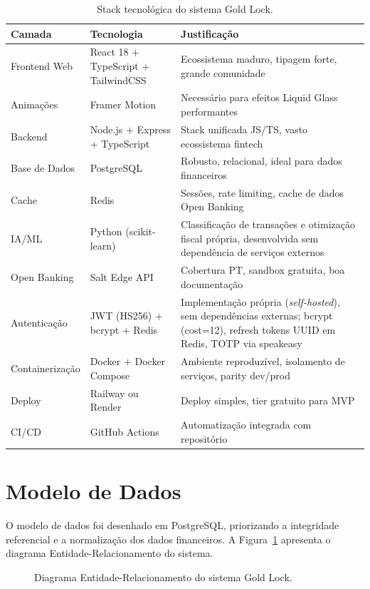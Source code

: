 \begin{table}[H]
\centering
\caption{Stack tecnológica do sistema Gold Lock.}
\label{tab:stack}
\small
\begin{tabularx}{\textwidth}{l l X}
\toprule
\textbf{Camada} & \textbf{Tecnologia} & \textbf{Justificação} \\
\midrule
Frontend Web & React 18 + TypeScript + TailwindCSS & Ecossistema maduro, tipagem forte, grande comunidade \\
Animações & Framer Motion & Necessário para efeitos Liquid Glass performantes \\
Backend & Node.js + Express + TypeScript & Stack unificada JS/TS, vasto ecossistema fintech \\
Base de Dados & PostgreSQL & Robusto, relacional, ideal para dados financeiros \\
Cache & Redis & Sessões, rate limiting, cache de dados Open Banking \\
IA/ML & Python (scikit-learn) & Classificação de transações e otimização fiscal própria, desenvolvida sem dependência de serviços externos \\
Open Banking & Salt Edge \ac{API} & Cobertura PT, sandbox gratuita, boa documentação \\
Autenticação & JWT (HS256) + bcrypt + Redis & Implementação própria (\textit{self-hosted}), sem dependências externas; bcrypt (cost=12), refresh tokens UUID em Redis, \ac{TOTP} via speakeasy \\
Containerização & Docker + Docker Compose & Ambiente reproduzível, isolamento de serviços, parity dev/prod \\
Deploy & Railway ou Render & Deploy simples, tier gratuito para \ac{MVP} \\
CI/CD & GitHub Actions & Automatização integrada com repositório \\
\bottomrule
\end{tabularx}
\end{table}


\section{Modelo de Dados}
\label{sec:arq-modelo-dados}

O modelo de dados foi desenhado em PostgreSQL, priorizando a integridade referencial e a normalização dos dados financeiros. A Figura~\ref{fig:modelo-er} apresenta o diagrama Entidade-Relacionamento do sistema.

\begin{figure}[H]
\centering

\caption{Diagrama Entidade-Relacionamento do sistema Gold Lock.}
\label{fig:modelo-er}
\end{figure}


